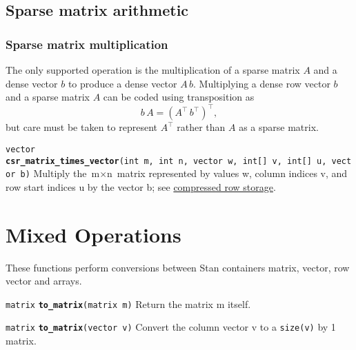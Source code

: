 \documentclass[
  10pt,
]{book}
\begin{document}
\hypertarget{sparse-matrix-arithmetic}{%
\section{Sparse matrix arithmetic}\label{sparse-matrix-arithmetic}}

\hypertarget{sparse-matrix-multiplication}{%
\subsection{Sparse matrix multiplication}\label{sparse-matrix-multiplication}}

The only supported operation is the multiplication of a sparse matrix
\(A\) and a dense vector \(b\) to produce a dense vector \(A\,b\).
Multiplying a dense row vector \(b\) and a sparse matrix \(A\) can be
coded using transposition as \[ b \, A = (A^{\top} \,
b^{\top})^{\top}, \] but care must be taken to represent \(A^{\top}\)
rather than \(A\) as a sparse matrix.


\texttt{vector} \textbf{\texttt{csr\_matrix\_times\_vector}}\texttt{(int\ m,\ int\ n,\ vector\ w,\ int{[}{]}\ v,\ int{[}{]}\ u,\ vector\ b)}\newline
Multiply the \(\text{m} \times \text{n}\) matrix represented by values
w, column indices v, and row start indices u by the vector b; see
\protect\hyperlink{CSR}{compressed row storage}.

\hypertarget{mixed-operations}{%
\chapter{Mixed Operations}\label{mixed-operations}}

These functions perform conversions between Stan containers matrix,
vector, row vector and arrays.


\texttt{matrix} \textbf{\texttt{to\_matrix}}\texttt{(matrix\ m)}\newline
Return the matrix m itself.


\texttt{matrix} \textbf{\texttt{to\_matrix}}\texttt{(vector\ v)}\newline
Convert the column vector v to a \texttt{size(v)} by 1 matrix.
\end{document}
